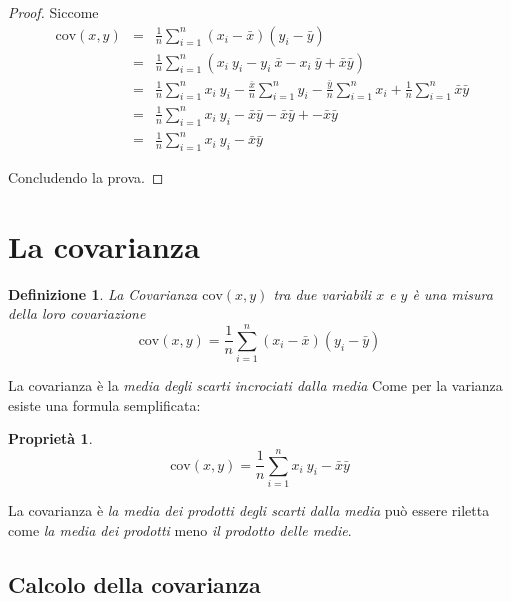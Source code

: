 \documentclass[
  11pt,
]{book}
\theoremstyle{mytheoremstyle}
\newtheorem{proposition}{Proprietà}[section]
\theoremstyle{mydefstyle}
\newtheorem{definition}{Definizione}[section]
\newenvironment{nota}
  {
\begin{tcolorbox}[enhanced,breakable,arc=0.1mm,boxrule=1pt,colback=white,colframe=iblue,title=\bf \fontfamily{lmss}\selectfont \faInfoCircle \hspace{.5 cm} Nota,drop fuzzy shadow]
}{
\end{tcolorbox}
  }
\begin{document}
\begin{proof}
Siccome
\begin{eqnarray*}
   \text{ cov}(x,y) &=& \frac 1 n\sum_{i=1}^n(x_i-\bar x)(y_i-\bar y)\\
   &=& \frac 1 n\sum_{i=1}^n(x_i~y_i - y_i~\bar x - x_i~\bar y + \bar x\bar y)\\
   &=& \frac 1 n\sum_{i=1}^n x_i~y_i - \frac {\bar x} n\sum_{i=1}^n y_i - \frac {\bar y} n\sum_{i=1}^nx_i + \frac 1 n\sum_{i=1}^n\bar x\bar y\\
   &=& \frac 1 n\sum_{i=1}^n x_i~y_i-\bar x\bar y-\bar x\bar y+-\bar x\bar y\\
   &=& \frac 1 n\sum_{i=1}^n x_i~y_i-\bar x\bar y
\end{eqnarray*}

Concludendo la prova.
\end{proof}

\section{La covarianza}\label{la-covarianza}

\begin{info}

\begin{definition}
La Covarianza \(\text{cov}(x,y)\) tra due variabili \(x\) e \(y\) è una misura della loro \emph{covariazione}
\[\text{cov}(x,y)=\frac 1 n\sum_{i=1}^n{(x_i-\bar x)(y_i-\bar y)}\]
\end{definition}

\end{info}

La covarianza è la \emph{media degli scarti incrociati dalla media}
Come per la varianza esiste una formula semplificata:

\begin{info}

\begin{proposition}
\[\text{cov}(x,y)=\frac 1 n\sum_{i=1}^nx_i~y_i-\bar x\bar y\]
\end{proposition}

\end{info}

\begin{nota}
La covarianza è \emph{la media dei prodotti degli scarti dalla media} può essere riletta come \emph{la media dei prodotti} meno \emph{il prodotto delle medie}.

\end{nota}

\subsection{Calcolo della covarianza}\label{calcolo-della-covarianza}
\end{document}
